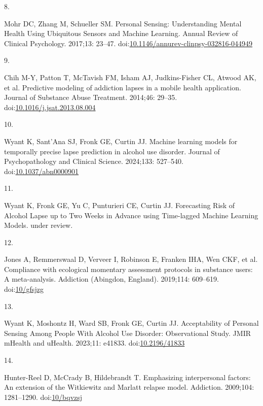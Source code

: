 \documentclass[
  letterpaper,
  DIV=11,
  numbers=noendperiod]{scrartcl}
\newlength{\cslhangindent}
\newlength{\csllabelwidth}
\newenvironment{CSLReferences}[2] %
 {\begin{list}{}{%
  \setlength{\itemindent}{0pt}
  \setlength{\leftmargin}{0pt}
  \setlength{\parsep}{0pt}
  \ifodd #1
   \setlength{\leftmargin}{\cslhangindent}
   \setlength{\itemindent}{-1\cslhangindent}
  \fi
  \setlength{\itemsep}{#2\baselineskip}}}
 {\end{list}}
\newcommand{\CSLLeftMargin}[1]{\parbox[t]{\csllabelwidth}{\strut#1\strut}}
\newcommand{\CSLRightInline}[1]{\parbox[t]{\linewidth - \csllabelwidth}{\strut#1\strut}}
\begin{document}
\begin{CSLReferences}{0}{1}
\CSLLeftMargin{8. }%
\CSLRightInline{Mohr DC, Zhang M, Schueller SM. Personal {Sensing}:
{Understanding Mental Health Using Ubiquitous Sensors} and {Machine
Learning}. Annual Review of Clinical Psychology. 2017;13: 23--47.
doi:\href{https://doi.org/10.1146/annurev-clinpsy-032816-044949}{10.1146/annurev-clinpsy-032816-044949}}

\CSLLeftMargin{9. }%
\CSLRightInline{Chih M-Y, Patton T, McTavish FM, Isham AJ,
Judkins-Fisher CL, Atwood AK, et al. Predictive modeling of addiction
lapses in a mobile health application. Journal of Substance Abuse
Treatment. 2014;46: 29--35.
doi:\href{https://doi.org/10.1016/j.jsat.2013.08.004}{10.1016/j.jsat.2013.08.004}}

\CSLLeftMargin{10. }%
\CSLRightInline{Wyant K, Sant'Ana SJ, Fronk GE, Curtin JJ. Machine
learning models for temporally precise lapse prediction in alcohol use
disorder. Journal of Psychopathology and Clinical Science. 2024;133:
527--540.
doi:\href{https://doi.org/10.1037/abn0000901}{10.1037/abn0000901}}

\CSLLeftMargin{11. }%
\CSLRightInline{Wyant K, Fronk GE, Yu C, Punturieri CE, Curtin JJ.
Forecasting {Risk} of {Alcohol Lapse} up to {Two Weeks} in {Advance}
using {Time-lagged Machine Learning Models}. under review. }

\CSLLeftMargin{12. }%
\CSLRightInline{Jones A, Remmerswaal D, Verveer I, Robinson E, Franken
IHA, Wen CKF, et al. Compliance with ecological momentary assessment
protocols in substance users: A meta-analysis. Addiction (Abingdon,
England). 2019;114: 609--619.
doi:\href{https://doi.org/10/gfsjzg}{10/gfsjzg}}

\CSLLeftMargin{13. }%
\CSLRightInline{Wyant K, Moshontz H, Ward SB, Fronk GE, Curtin JJ.
Acceptability of {Personal Sensing Among People With Alcohol Use
Disorder}: {Observational Study}. JMIR mHealth and uHealth. 2023;11:
e41833. doi:\href{https://doi.org/10.2196/41833}{10.2196/41833}}

\CSLLeftMargin{14. }%
\CSLRightInline{Hunter-Reel D, McCrady B, Hildebrandt T. Emphasizing
interpersonal factors: An extension of the {Witkiewitz} and {Marlatt}
relapse model. Addiction. 2009;104: 1281--1290.
doi:\href{https://doi.org/10/bqvzsj}{10/bqvzsj}}


\end{CSLReferences}
\end{document}
